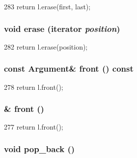 \begin{DoxyCode}
283 { return l.erase(first, last); }
\end{DoxyCode}
\hypertarget{classVarArgs_1_1List_aff88043b8fd94b37279562c24739d9e5}{
\subsubsection[{erase}]{\setlength{\rightskip}{0pt plus 5cm}void erase ({\bf iterator} {\em position})}}
\label{classVarArgs_1_1List_aff88043b8fd94b37279562c24739d9e5}



\begin{DoxyCode}
282 { return l.erase(position); }
\end{DoxyCode}
\hypertarget{classVarArgs_1_1List_aec86265b938450f64beaf6f14115806d}{
\subsubsection[{front}]{\setlength{\rightskip}{0pt plus 5cm}const {\bf Argument}\& front () const}}
\label{classVarArgs_1_1List_aec86265b938450f64beaf6f14115806d}



\begin{DoxyCode}
278 { return l.front(); }
\end{DoxyCode}
\hypertarget{classVarArgs_1_1List_a26869ef6dc59bd6289cca40aa896f069}{
\subsubsection[{front}]{\& front ()}}
\label{classVarArgs_1_1List_a26869ef6dc59bd6289cca40aa896f069}



\begin{DoxyCode}
277 { return l.front(); }
\end{DoxyCode}
\hypertarget{classVarArgs_1_1List_a058bda4957df6a97b1ea6c9fd783f672}{
\subsubsection[{pop\_\-back}]{\setlength{\rightskip}{0pt plus 5cm}void pop\_\-back ()}}
\label{classVarArgs_1_1List_a058bda4957df6a97b1ea6c9fd783f672}



